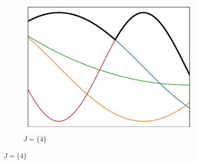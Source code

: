 \begin{figure}[H]
\begin{subfigure}{0.32\textwidth}
         \centering
         \includegraphics[width=\textwidth]{pictures/minimax.pdf}
         \caption{$J=\{4\}$}
         \label{fig:minimax}
     \end{subfigure}


\end{figure}
